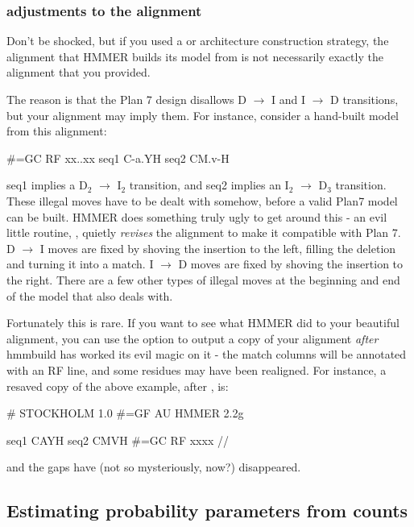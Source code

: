 \subsubsection{adjustments to the alignment}

Don't be shocked, but if you used a  or 
architecture construction strategy, the alignment that HMMER builds
its model from is not necessarily exactly the alignment that you
provided.

The reason is that the Plan 7 design disallows D $\rightarrow$ I and I
$\rightarrow$ D transitions, but your alignment may imply them.  For
instance, consider a hand-built model from this alignment:

\begin{sreoutput}
#=GC RF   xx..xx
seq1      C-a.YH
seq2      CM.v-H
\end{sreoutput}

seq1 implies a D$_2$ $\rightarrow$ I$_2$ transition, and seq2 implies
an I$_2$ $\rightarrow$ D$_3$ transition. These illegal moves have to
be dealt with somehow, before a valid Plan7 model can be built. HMMER
does something truly ugly to get around this - an evil little routine,
, quietly \emph{revises} the
alignment to make it compatible with Plan 7.  D $\rightarrow$ I moves
are fixed by shoving the insertion to the left, filling the deletion
and turning it into a match.  I $\rightarrow$ D moves are fixed by
shoving the insertion to the right. There are a few other types of
illegal moves at the beginning and end of the model that
 also deals with.

Fortunately this is rare. If you want to see what HMMER did to your
beautiful alignment, you can use the  option to
output a copy of your alignment \emph{after} hmmbuild has worked its
evil magic on it - the match columns will be annotated with an RF
line, and some residues may have been realigned. For instance, a
resaved copy of the above example, after ,
is:

\begin{sreoutput}
# STOCKHOLM 1.0
#=GF AU    HMMER 2.2g

seq1        CAYH
seq2        CMVH
#=GC RF     xxxx
//
\end{sreoutput}

and the gaps have (not so mysteriously, now?) disappeared.

\subsection{Estimating probability parameters from counts}

